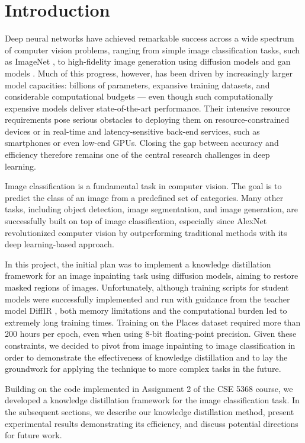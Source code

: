 \section{Introduction}

Deep neural networks have achieved remarkable success across a wide spectrum of computer vision problems,
ranging from simple image classification tasks, such as ImageNet \cite{deng2009imagenet},
to high-fidelity image generation using diffusion models \cite{ho2020denoising, rombach2022high, xia2023diffir} and \gls*{gan} models \cite{goodfellow2014generative, nazeri2019edgeconnect}.
Much of this progress, however, has been driven by increasingly larger model capacities:
billions of parameters, expansive training datasets, and considerable computational budgets —
even though such computationally expensive models deliver state-of-the-art performance.
Their intensive resource requirements pose serious obstacles to deploying them
on resource-constrained devices or in real-time and latency-sensitive back-end services,
such as smartphones or even low-end GPUs.
Closing the gap between accuracy and efficiency therefore remains one of the central research challenges in deep learning.

Image classification is a fundamental task in computer vision.
The goal is to predict the class of an image from a predefined set of categories.
Many other tasks, including object detection, image segmentation, and image generation,
are successfully built on top of image classification,
especially since AlexNet \cite{krizhevsky2012imagenet} revolutionized computer vision by outperforming traditional methods
with its deep learning-based approach.

In this project, the initial plan was to implement a knowledge distillation framework
for an image inpainting task using diffusion models,
aiming to restore masked regions of images.
Unfortunately, although training scripts for student models were successfully implemented and run with guidance from the teacher model DiffIR \cite{xia2023diffir},
both memory limitations and the computational burden
led to extremely long training times.
Training on the Places dataset \cite{zhou2017places} required more than 200 hours per epoch,
even when using 8-bit floating-point precision.
Given these constraints, we decided to pivot from image inpainting to image classification
in order to demonstrate the effectiveness of knowledge distillation
and to lay the groundwork for applying the technique to more complex tasks in the future.

Building on the code implemented in Assignment 2 of the CSE 5368 course,
we developed a knowledge distillation framework for the image classification task.
In the subsequent sections, we describe our knowledge distillation method,
present experimental results demonstrating its efficiency,
and discuss potential directions for future work.
